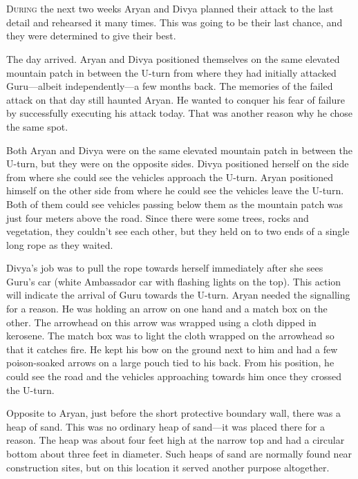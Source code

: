 \chapter{}

\lettrine{D}{uring} the next two weeks Aryan and Divya planned their attack to the last
detail and rehearsed it many times. This was going to be their last chance, and
they were determined to give their best.

The day arrived. Aryan and Divya positioned themselves on the same elevated
mountain patch in between the U-turn from where they had initially attacked
Guru—albeit independently—a few months back. The memories of the failed attack
on that day still haunted Aryan. He wanted to conquer his fear of failure by
successfully executing his attack today. That was another reason why he chose
the same spot.

Both Aryan and Divya were on the same elevated mountain patch in between the
U-turn, but they were on the opposite sides. Divya positioned herself on the
side from where she could see the vehicles approach the U-turn. Aryan positioned
himself on the other side from where he could see the vehicles leave the U-turn.
Both of them could see vehicles passing below them as the mountain patch was
just four meters above the road. Since there were some trees, rocks and
vegetation, they couldn't see each other, but they held on to two ends of a
single long rope as they waited.

Divya's job was to pull the rope towards herself immediately after she sees
Guru's car (white Ambassador car with flashing lights on the top). This action
will indicate the arrival of Guru towards the U-turn. Aryan needed the signalling
for a reason. He was holding an arrow on one hand and a match box on the other.
The arrowhead on this arrow was wrapped using a cloth dipped in kerosene. The
match box was to light the cloth wrapped on the arrowhead so that it catches
fire. He kept his bow on the ground next to him and had a few poison-soaked
arrows on a large pouch tied to his back. From his position, he could see the
road and the vehicles approaching towards him once they crossed the U-turn.

Opposite to Aryan, just before the short protective boundary wall, there was a
heap of sand. This was no ordinary heap of sand—it was placed there for a
reason. The heap was about four feet high at the narrow top and had a circular
bottom about three feet in diameter. Such heaps of sand are normally found near
construction sites, but on this location it served another purpose altogether.

